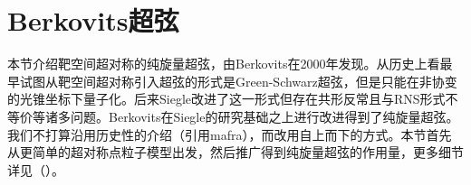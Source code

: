 \chapter{Berkovits超弦}
本节介绍靶空间超对称的纯旋量超弦，由Berkovits在2000年发现\cite{Berkovits:2000fe}。从历史上看最早试图从靶空间超对称引入超弦的形式是Green-Schwarz超弦，但是只能在非协变的光锥坐标下量子化。后来Siegle改进了这一形式但存在共形反常且与RNS形式不等价等诸多问题。Berkovits在Siegle的研究基础之上进行改进得到了纯旋量超弦。我们不打算沿用历史性的介绍（引用mafra），而改用自上而下的方式。本节首先从更简单的超对称点粒子模型出发，然后推广得到纯旋量超弦的作用量，更多细节详见（）。